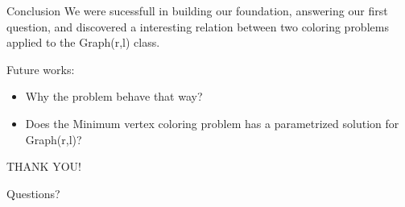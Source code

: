 \documentclass[9pt, compress]{beamer}
\begin{document}
    \begin{frame}{Conclusion}
       We were sucessfull in building our foundation, answering our first question, and discovered a interesting relation between two coloring problems applied to the Graph(r,l) class.
       
       Future works:
       \begin{itemize}
         \item Why the problem behave that way?
         \item Does the Minimum vertex coloring problem has a parametrized solution for Graph(r,l)?
       \end{itemize}
     \end{frame}
     \begin{frame}[standout]
       THANK YOU!
       
       Questions?
     \end{frame}
\end{document}
